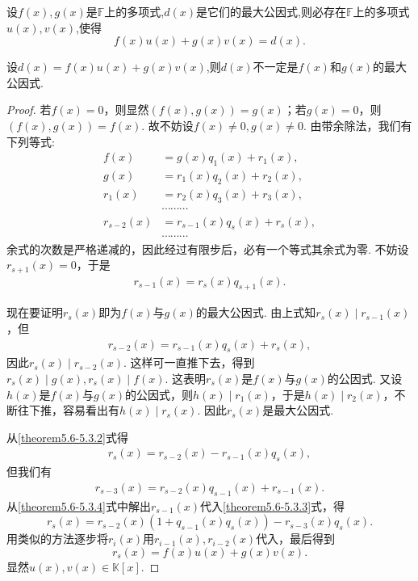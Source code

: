 \documentclass[../../main.tex]{subfiles}%
\begin{document}
\begin{theorem}[最大公因式的必要条件]\label{theorem:最大公因式的必要条件}
设\(f(x),g(x)\)是\(\mathbb{F}\)上的多项式,\(d(x)\)是它们的最大公因式,则必存在\(\mathbb{F}\)上的多项式\(u(x),v(x)\),使得\[f(x)u(x)+g(x)v(x)=d(x).\]
\end{theorem}
\begin{remark}
设\(d(x)=f(x)u(x)+g(x)v(x)\),则\(d(x)\)不一定是\(f(x)\)和\(g(x)\)的最大公因式.
\end{remark}
\begin{proof}
若\(f(x)=0\)，则显然\((f(x),g(x)) = g(x)\)；若\(g(x)=0\)，则\((f(x),g(x)) = f(x)\). 故不妨设\(f(x)\neq 0,g(x)\neq 0\). 由带余除法，我们有下列等式:
\begin{align*}
f(x)&=g(x)q_1(x)+r_1(x),\\
g(x)&=r_1(x)q_2(x)+r_2(x),\\
r_1(x)&=r_2(x)q_3(x)+r_3(x),\\
&\cdots\cdots\cdots\\
r_{s - 2}(x)&=r_{s - 1}(x)q_s(x)+r_s(x),\\
&\cdots\cdots\cdots
\end{align*}
余式的次数是严格递减的，因此经过有限步后，必有一个等式其余式为零. 不妨设\(r_{s + 1}(x)=0\)，于是
\begin{align}
r_{s - 1}(x)=r_s(x)q_{s + 1}(x). \label{theorem5.6-5.3.1}
\end{align}

现在要证明\(r_s(x)\)即为\(f(x)\)与\(g(x)\)的最大公因式. 由上式知\(r_s(x)\mid r_{s - 1}(x)\)，但
\begin{align}
r_{s - 2}(x)=r_{s - 1}(x)q_s(x)+r_s(x),\label{theorem5.6-5.3.2}   
\end{align}
因此\(r_s(x)\mid r_{s - 2}(x)\). 这样可一直推下去，得到\(r_s(x)\mid g(x),r_s(x)\mid f(x)\). 这表明\(r_s(x)\)是\(f(x)\)与\(g(x)\)的公因式. 又设\(h(x)\)是\(f(x)\)与\(g(x)\)的公因式，则\(h(x)\mid r_1(x)\)，于是\(h(x)\mid r_2(x)\)，不断往下推，容易看出有\(h(x)\mid r_s(x)\). 因此\(r_s(x)\)是最大公因式.

从\eqref{theorem5.6-5.3.2}式得
\begin{align}
r_s(x)=r_{s - 2}(x)-r_{s - 1}(x)q_s(x),\label{theorem5.6-5.3.3}    
\end{align}
但我们有
\begin{align}
r_{s - 3}(x)=r_{s - 2}(x)q_{s - 1}(x)+r_{s - 1}(x).\label{theorem5.6-5.3.4}  
\end{align}
从\eqref{theorem5.6-5.3.4}式中解出\(r_{s - 1}(x)\)代入\eqref{theorem5.6-5.3.3}式，得
\[
r_s(x)=r_{s - 2}(x)(1 + q_{s - 1}(x)q_s(x))-r_{s - 3}(x)q_s(x).
\]
用类似的方法逐步将\(r_i(x)\)用\(r_{i - 1}(x),r_{i - 2}(x)\)代入，最后得到
\[
r_s(x)=f(x)u(x)+g(x)v(x).
\]
显然\(u(x),v(x)\in\mathbb{K}[x]\).
\end{proof}
\end{document}
